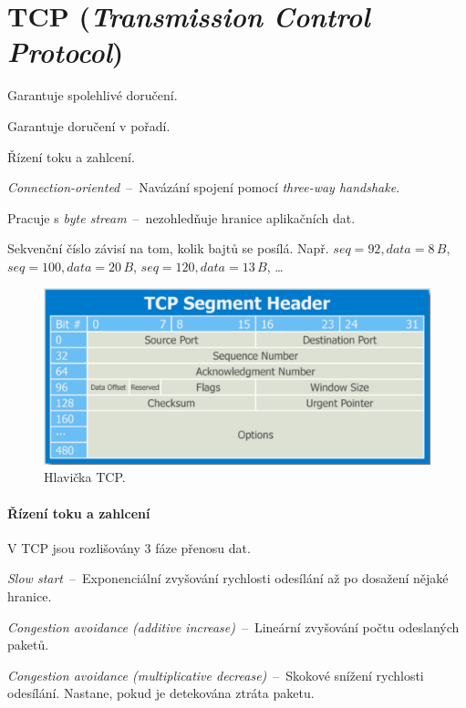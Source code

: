 \section{TCP (\textit{Transmission Control Protocol})}

\begin{compactitem}
    \item Garantuje spolehlivé doručení.
    \item Garantuje doručení v pořadí.
    \item Řízení toku a zahlcení.
    \item \textit{Connection-oriented}~--~Navázání spojení pomocí \textit{three-way handshake}.
    \item Pracuje s \textit{byte stream}~--~nezohledňuje hranice aplikačních dat.
    \item Sekvenční číslo závisí na tom, kolik bajtů se posílá. Např. $seq=92, data=8\,B$, $seq=100, data=20\,B$, $seq=120, data=13\,B$, \dots
\end{compactitem}

\begin{figure}[H]
    \centering
    \includegraphics[width=0.75\linewidth]{tcp_header.png}
    \caption{Hlavička TCP.}
\end{figure}

\paragraph*{Řízení toku a zahlcení} V TCP jsou rozlišovány 3 fáze přenosu dat. \begin{compactitem}
    \item \textit{Slow start}~--~Exponenciální zvyšování rychlosti odesílání až po dosažení nějaké hranice.
    \item \textit{Congestion avoidance (additive increase)}~--~Lineární zvyšování počtu odeslaných paketů.
    \item \textit{Congestion avoidance (multiplicative decrease)}~--~Skokové snížení rychlosti odesílání. Nastane, pokud je detekována ztráta paketu.
\end{compactitem}

